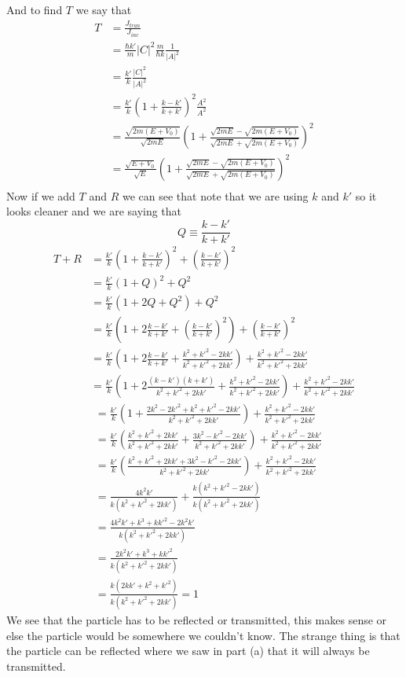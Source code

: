 \documentclass[11pt]{article}
\numberwithin{equation}{section}
\begin{document}
\begin{enumerate}[(a)]
And to find $T$ we say that
\begin{align*}
T &= \frac{J_{tran}}{J_{inc}}\\
&= \frac{\hbar k'}{m}|C|^2\frac{m}{\hbar k}\frac{1}{|A|^2}\\
&= \frac{k'}{k}\frac{|C|^2}{|A|^2}\\
&= \frac{k'}{k}\left(1+\frac{k-k'}{k+k'}\right)^2\frac{A^2}{A^2}\\
&= \frac{\sqrt{2m(E+V_0)}}{\sqrt{2mE}}\left(1+\frac{\sqrt{2mE}-\sqrt{2m(E+V_0)}}{\sqrt{2mE}+\sqrt{2m(E+V_0)}}\right)^2\\
&= \frac{\sqrt{E+V_0}}{\sqrt{E}}\left(1+\frac{\sqrt{2mE}-\sqrt{2m(E+V_0)}}{\sqrt{2mE}+\sqrt{2m(E+V_0)}}\right)^2\\
\end{align*}
Now if we add $T$ and $R$ we can see that note that we are using $k$ and $k'$ so it looks cleaner and we are saying that 
$$Q\equiv\frac{k-k'}{k+k'}$$
\begin{align*}
T+R &= \frac{k'}{k}\left(1+\frac{k-k'}{k+k'}\right)^2+\left(\frac{k-k'}{k+k'}\right)^2\\
&= \frac{k'}{k}\left(1+Q\right)^2+Q^2\\
&= \frac{k'}{k}\left(1+2Q+Q^2\right)+Q^2\\
&= \frac{k'}{k}\left(1+2\frac{k-k'}{k+k'}+\left(\frac{k-k'}{k+k'}\right)^2\right)+\left(\frac{k-k'}{k+k'}\right)^2\\
&= \frac{k'}{k}\left(1+2\frac{k-k'}{k+k'}+\frac{k^2+k'^2-2kk'}{k^2+k'^2+2kk'}\right)+\frac{k^2+k'^2-2kk'}{k^2+k'^2+2kk'}\\
&= \frac{k'}{k}\left(1+2\frac{(k-k')(k+k')}{k^2+k'^2+2kk'}+\frac{k^2+k'^2-2kk'}{k^2+k'^2+2kk'}\right)+\frac{k^2+k'^2-2kk'}{k^2+k'^2+2kk'}
\end{align*}
\begin{align*}
&= \frac{k'}{k}\left(1+\frac{2k^2-2k'^2+k^2+k'^2-2kk'}{k^2+k'^2+2kk'}\right)+\frac{k^2+k'^2-2kk'}{k^2+k'^2+2kk'}\\
&= \frac{k'}{k}\left(\frac{k^2+k'^2+2kk'}{k^2+k'^2+2kk'}+\frac{3k^2-k'^2-2kk'}{k^2+k'^2+2kk'}\right)+\frac{k^2+k'^2-2kk'}{k^2+k'^2+2kk'}\\
&= \frac{k'}{k}\left(\frac{k^2+k'^2+2kk'+3k^2-k'^2-2kk'}{k^2+k'^2+2kk'}\right)+\frac{k^2+k'^2-2kk'}{k^2+k'^2+2kk'}\\
&= \frac{4k^2k'}{k(k^2+k'^2+2kk')}+\frac{k(k^2+k'^2-2kk')}{k(k^2+k'^2+2kk')}\\
&= \frac{4k^2k'+k^3+kk'^2-2k^2k'}{k(k^2+k'^2+2kk')}\\
&= \frac{2k^2k'+k^3+kk'^2}{k(k^2+k'^2+2kk')}\\
&= \frac{k(2kk'+k^2+k'^2)}{k(k^2+k'^2+2kk')} = 1
\end{align*}
We see that the particle has to be reflected or transmitted, this makes sense or else the particle would be somewhere we couldn't know. The strange thing is that the particle can be reflected where we saw in part (a) that it will always be transmitted.


\end{enumerate}
\end{document}
